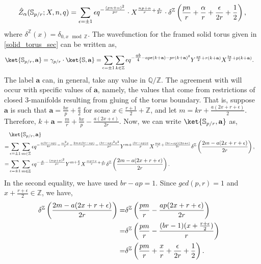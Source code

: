 \documentclass{article}
\newcommand{\Z}{{\mathbb Z}}
\newcommand{\Q}{{\mathbb Q}}
\numberwithin{corollary}{theorem}
\numberwithin{corollary}{proposition}
\begin{document}
$$\Hat{Z}_\alpha(\mathbb{S}_{p/r};X,n,q) = \sum_{\epsilon=\pm 1}\epsilon q^{- \frac{(p n + \alpha)^{2}}{p r}}\cdot X^{\frac{n p + \alpha}{r} + \frac{\epsilon}{2r}} \cdot \delta^\mathbb{Z}\left( \frac{p n}{r}+\frac{\alpha}{r}+ \frac{\epsilon}{2r} +\frac{1}{2}\right),$$
where $\delta^\mathbb{Z}(x) = \delta_{0,x\mod{\mathbb{Z}}}$. 
The wavefunction for the framed solid torus given in \ref{solid_torus_sec} can be written as, 
\begin{align*}
    \ket{\mathbb{S}_{p/r} , \mathbf{a} } =\gamma_{p/r}\cdot \ket{\mathbb{S},\mathbf{a}}= & \sum_{\epsilon = \pm 1} \sum_{k \in \Z}  \epsilon q^{- \tfrac{a b}{4} - a p \epsilon (k+\mathbf{a}) - p r (k+\mathbf{a})^{2} } Y^{ \frac{a \epsilon}{2} + r (k + \mathbf{a})} X^{\frac{b \epsilon}{2} + p(k + \mathbf{a}) }.
\end{align*}
The label $\mathbf{a}$ can, in general, take any value in $\Q/\Z$. The agreement with \cite{GM} will occur with specific values of $\mathbf{a}$, namely, the values that come from restrictions of closed 3-manifolds resulting from gluing of the torus boundary. That is, suppose $\mathbf{a}$ is such that $\mathbf{a} = \frac{b x}{p} + \frac{a}{2}$ for some $x \in \frac{r+1}{2} + \Z$, and let $m = k r + \frac{a(2 x + r + \epsilon)}{2}$. Therefore, $k + \mathbf{a} = \frac{m}{r} + \frac{b x}{p} - \frac{a(2 x + \epsilon)}{2r} $. Now, we can write $\ket{\mathbb{S}_{p/r} , \mathbf{a} } $ as, 
\begin{align*}
& \ket{\mathbb{S}_{p/r} , \mathbf{a} } \endline = & \sum_{\epsilon = \pm 1} \sum_{m \in \Z} \epsilon q^{- \frac{a(b r - a p)}{4 r} - \frac{m^{2}p}{r} - \frac{ 2 m x (b r - a p)}{r} - \frac{(b r - a p )^{2} x^{2}}{p r} }  Y^{ m + \frac{(b r - a p) x}{p}} X^{ \frac{ m p }{ r} + \frac{(b r - a p)(2 x + \epsilon)}{2 r} } \delta^{\Z}\left( \frac{2 m-a(2x+ r + \epsilon)}{2r} \right),   \endline
 = & \sum_{\epsilon = \pm 1} \sum_{m \in \Z} \epsilon q^{- \frac{a}{4 r} - \frac{(m p + x)^{2}}{p r} }  Y^{ m + \frac{ x}{p}} X^{ \frac{ m p + x}{ r} + \frac{ \epsilon}{2 r} } \delta^{\Z}\left( \frac{2 m-a(2x+ r + \epsilon)}{2r} \right) .
\end{align*}
In the second equality, we have used $ b r - a p =1$. Since $gcd(p,r)=1$ and $ x+ \frac{r + \epsilon}{2} \in \Z$, we have,
\begin{align*}
    \delta^{\Z}\left( \frac{2 m-a(2x+ r + \epsilon)}{2r} \right) = & \delta^{\Z}\left(  \frac{p m }{r} - \frac{a p (2 x + r + \epsilon)}{2 r}  \right) \endline
   =  & \delta^{\Z}\left(  \frac{p m }{r} - \frac{(b r -1) ( x + \frac{r + \epsilon}{2})}{ r}  \right) \endline
   = & \delta^{\Z}\left(  \frac{p m }{r} + \frac{x}{r} + \frac{\epsilon}{2r} + \frac{1}{2}  \right).
\end{align*}
\end{document}

